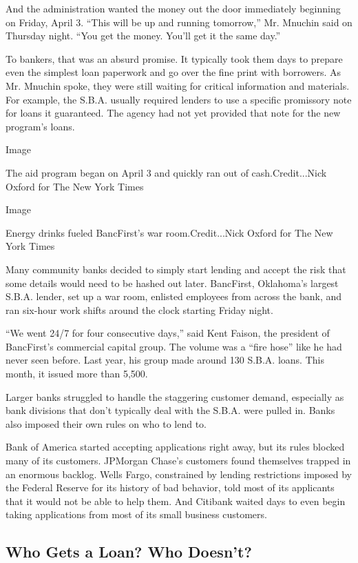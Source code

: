 And the administration wanted the money out the door immediately
beginning on Friday, April 3. ``This will be up and running tomorrow,''
Mr. Mnuchin said on Thursday night. ``You get the money. You'll get it
the same day.''

To bankers, that was an absurd promise. It typically took them days to
prepare even the simplest loan paperwork and go over the fine print with
borrowers. As Mr. Mnuchin spoke, they were still waiting for critical
information and materials. For example, the S.B.A. usually required
lenders to use a specific promissory note for loans it guaranteed. The
agency had not yet provided that note for the new program's loans.

Image

The aid program began on April 3 and quickly ran out of
cash.Credit...Nick Oxford for The New York Times

Image

Energy drinks fueled BancFirst's war room.Credit...Nick Oxford for The
New York Times

Many community banks decided to simply start lending and accept the risk
that some details would need to be hashed out later. BancFirst,
Oklahoma's largest S.B.A. lender, set up a war room, enlisted employees
from across the bank, and ran six-hour work shifts around the clock
starting Friday night.

``We went 24/7 for four consecutive days,'' said Kent Faison, the
president of BancFirst's commercial capital group. The volume was a
``fire hose'' like he had never seen before. Last year, his group made
around 130 S.B.A. loans. This month, it issued more than 5,500.

Larger banks struggled to handle the staggering customer demand,
especially as bank divisions that don't typically deal with the S.B.A.
were pulled in. Banks also imposed their own rules on who to lend to.

Bank of America started accepting applications right away, but its rules
blocked many of its customers. JPMorgan Chase's customers found
themselves trapped in an enormous backlog. Wells Fargo, constrained by
lending restrictions imposed by the Federal Reserve for its history of
bad behavior, told most of its applicants that it would not be able to
help them. And Citibank waited days to even begin taking applications
from most of its small business customers.

\hypertarget{who-gets-a-loan-who-doesnt}{%
\subsection{Who Gets a Loan? Who
Doesn't?}\label{who-gets-a-loan-who-doesnt}}

